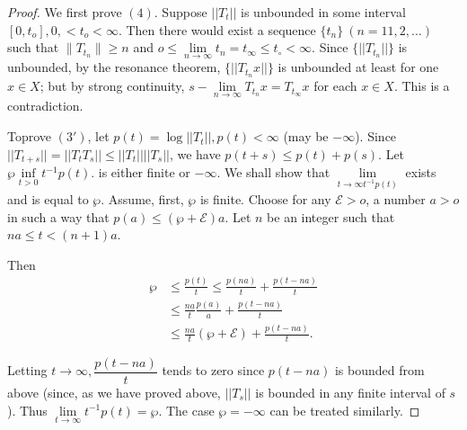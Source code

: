 \begin{proof}
 We first prove $(4)$. Suppose $|| T_t||$ is unbounded in some
 interval $[ 0, t_o], 0, < t_o < \infty $. Then there would exist a
 sequence $\{t_n\} ~(n = 1 1, 2, \ldots )$ such that $\|T_{ t_n}\| \geq
 n$ and $o \leq \lim\limits_{ n \to \infty} t_n = t_\infty \leq
 t_\circ < \infty$. Since $\big\{ || T_{
  t_n}||\big\}$ is unbounded, by the resonance theorem,
 $\big\{|| T_{t_n}x|| \big\}$ is unbounded at least for
 one $x \in X$; but by strong continuity, $ s - \lim\limits_{ n \to
  \infty} T_{ t_n} x= T_{t_\infty}x$ for each $x \in X$. This is a
 contradiction.  

 To\pageoriginale prove $(3')$, let $p(t) = \log|| T_t||, p(t) < \infty$ (may be
 $-\infty$). Since $|| T_{t + s} ||= ||T_t T_s|| \leq || T_t || ||
 T_s ||$, we have $p(t+s)\leq p(t) + p(s)$. Let $\wp
 \inf\limits_{t > 0} t^{-1} p(t)$. is either finite or $- \infty$. We
 shall show that $\lim\limits_{t \to \infty t^{-1} p(t)}$ exists and is equal to
 $\wp$. Assume, first, 
 $\wp$ is finite. Choose for any $\mathcal{E} > o$, a number $a>o$ in
 such a way that $p(a) \leq (\wp + \mathcal{E}) a$. Let $n$ be an
 integer such that $n a \leq t < (n +1)a$. 

 Then 
 \begin{align*}
  \wp & \leq \frac{p(t)}{t} \leq \frac{p(na)}{t} + \frac{p(t - na)}{t}\\
  & \leq \frac{na }{t} \frac{p(a)}{a} + \frac{p(t -na)}{t}\\
  & \leq \frac{na}{t} (\wp + \mathcal{E})+\frac{p(t - na)}{t}.
 \end{align*}

 Letting $t \to \infty, \dfrac{p(t -na )}{t}$ tends to zero since
 $p(t -na )$ is bounded from above (since, as we have proved above,
 $|| T_s ||$ is bounded in any finite interval of $s$). Thus
 $\lim\limits_{t \to \infty} t^{-1} p(t) = \wp $. The case $\wp = -
 \infty$ can be treated similarly.
\end{proof}
